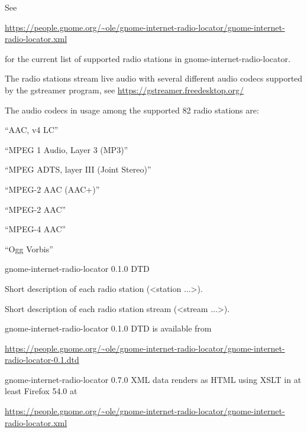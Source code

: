 \documentclass[20pt,landscape]{foils}
\begin{document}
See
\begin{tiny}\url{https://people.gnome.org/~ole/gnome-internet-radio-locator/gnome-internet-radio-locator.xml}\end{tiny} for the current list of supported radio stations in gnome-internet-radio-locator.


The radio stations stream live audio with several different audio codecs supported by the gstreamer program, see \url{https://gstreamer.freedesktop.org/}

The audio codecs in usage among the supported 82 radio stations are:

\begin{list1}
  \item
    \begin{list2}
    \item ``AAC, v4 LC''
    \item ``MPEG 1 Audio, Layer 3 (MP3)''
    \item ``MPEG ADTS, layer III (Joint Stereo)''
    \item ``MPEG-2 AAC (AAC+)''
    \item ``MPEG-2 AAC''
    \item ``MPEG-4 AAC''
    \item ``Ogg Vorbis''
    \end{list2}
\end{list1}


\begin{list1}
\item gnome-internet-radio-locator 0.1.0 DTD
\item Short description of each radio station (<station ...>).
\item Short description of each radio station stream (<stream ...>).
\item gnome-internet-radio-locator 0.1.0 DTD is available from \begin{tiny}\url{https://people.gnome.org/~ole/gnome-internet-radio-locator/gnome-internet-radio-locator-0.1.dtd}\end{tiny}
\item gnome-internet-radio-locator 0.7.0 XML data renders as HTML using XSLT in at least Firefox 54.0 at \begin{tiny}\url{https://people.gnome.org/~ole/gnome-internet-radio-locator/gnome-internet-radio-locator.xml}\end{tiny}
\end{list1}
\end{document}
